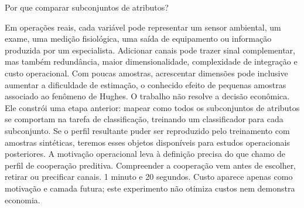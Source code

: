 \begin{frame}{Por que comparar subconjuntos de atributos?}
  \vspace{0.14cm}

  \speakernotes
    {Em operações reais, cada variável pode representar um sensor ambiental, um exame, uma medição fisiológica, uma saída de equipamento ou informação produzida por um especialista. Adicionar canais pode trazer sinal complementar, mas também redundância, maior dimensionalidade, complexidade de integração e custo operacional. Com poucas amostras, acrescentar dimensões pode inclusive aumentar a dificuldade de estimação, o conhecido efeito de pequenas amostras associado ao fenômeno de Hughes. O trabalho não resolve a decisão econômica. Ele constrói uma etapa anterior: mapear como todos os subconjuntos de atributos se comportam na tarefa de classificação, treinando um classificador para cada subconjunto. Se o perfil resultante puder ser reproduzido pelo treinamento com amostras sintéticas, teremos esses objetos disponíveis para estudos operacionais posteriores.}
    {A motivação operacional leva à definição precisa do que chamo de perfil de cooperação preditiva.}
    {Compreender a cooperação vem antes de escolher, retirar ou precificar canais.}
    {1 minuto e 20 segundos.}
    {Custo aparece apenas como motivação e camada futura; este experimento não otimiza custos nem demonstra economia.}
\end{frame}

